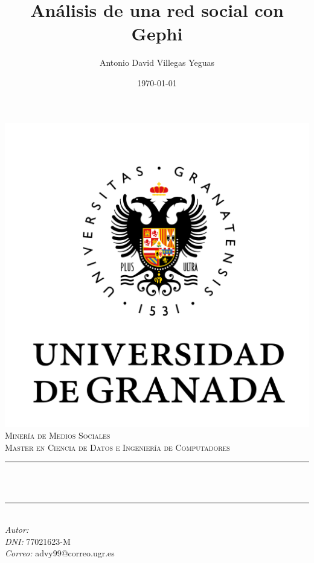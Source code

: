 \documentclass[12pt, spanish]{article}
\title{Análisis de una red social con Gephi}
\author{Antonio David Villegas Yeguas}
\date{\today}
\makeatletter
\let\thetitle\@title
\let\theauthor\@author
\makeatother
\begin{document}


\begin{titlepage}
    \centering
    \vspace*{-2cm}
    \includegraphics[scale = 0.50]{ugr.png}\\[0.3 cm]
    \textsc{\large Minería de Medios Sociales}\\[0.5 cm]
    \textsc{\large Master en Ciencia de Datos e Ingeniería de Computadores}\\[0 cm]
    \rule{\linewidth}{0.2 mm} \\[0.4cm]
    { \Large \bfseries \thetitle}\\
    \rule{\linewidth}{0.2 mm} \\[1 cm]

     {\large
      \emph{Autor: } \theauthor\\
	   \emph{DNI:   }  77021623-M \\
      \emph{Correo:} advy99@correo.ugr.es}


\end{titlepage}
\end{document}
